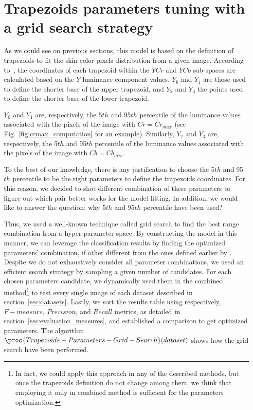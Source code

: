 \section{Trapezoids parameters tuning with a grid search strategy}
\label{sec:trapezoids_params_tunning}
\noindent As we could see on previous sections, this model is based on the definition of trapezoids to fit the skin color pixels distribution from a given image. According to~\citet{brancati:17}, the coordinates of each trapezoid within the $YCr$ and $YCb$ sub-spaces are calculated based on the $Y$ luminance component values. $Y_0$ and $Y_1$ are those used to define the shorter base of the upper trapezoid, and $Y_2$ and $Y_3$ the points used to define the shorter base of the lower trapezoid.

$Y_0$ and $Y_1$ are, respectively, the 5${th}$ and 95$th$ percentile of the luminance values associated with the pixels of the image with $Cr = Cr_{max}$ (see Fig.~\ref{fig:crmax_computation} for an example). Similarly, $Y_2$ and $Y_3$ are, respectively, the 5${th}$ and 95$th$ percentile of the luminance values associated with the pixels of the image with $Cb = Cb_{min}$.

To the best of our knowledge, there is any justification to choose the 5${th}$ and 95$th$ percentile to be the right parameters to define the trapezoids coordinates. For this reason, we decided to shot different combination of these parameters to figure out which pair better works for the model fitting. In addition, we would like to answer the question: why 5${th}$ and 95$th$ percentile have been used?

Thus, we used a well-known technique called grid search to find the best range combination from a hyper-parameter space. By constructing the model in this manner, we can leverage the classification results by finding the optimized parameters' combination, if other different from the ones defined earlier by \citet{brancati:17}. Despite we do not exhaustively consider all parameter combinations, we used an efficient search strategy by sampling a given number of candidates. For each chosen parameters candidate, we dynamically used them in the combined method\footnote{In fact, we could apply this approach in any of the described methods, but once the trapezoids definition do not change among them, we think that employing it only in combined method is sufficient for the parameters optimization.} to test every single image of each dataset described in section~\ref{sec:datasets}. Lastly, we sort the results table using respectively, $F-measure$, $Precision$, and $Recall$ metrics, as detailed in section~\ref{sec:evaluation_measures}, and established a comparison to get optimized parameters. The algorithm $\proc{Trapezoids-Parameters-Grid-Search}(dataset)$ shows how the grid search have been performed.

